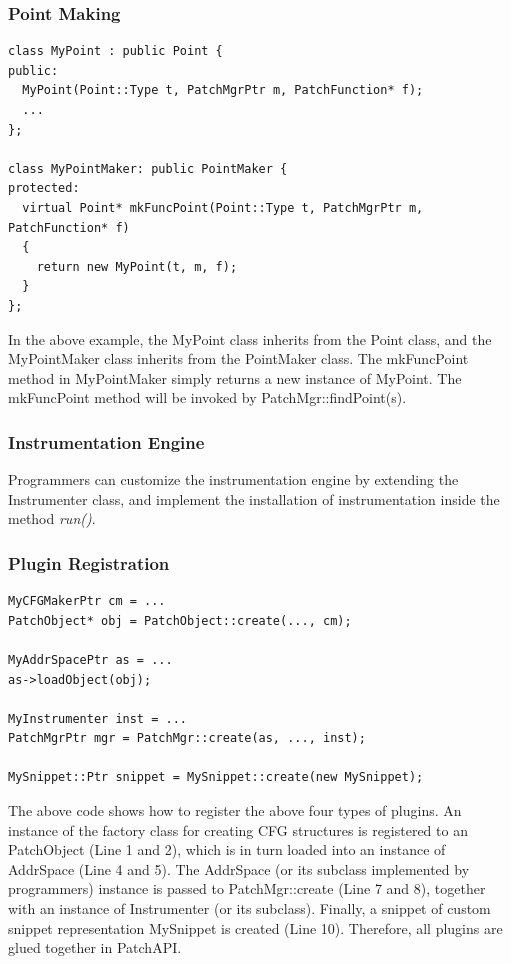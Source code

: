 \subsubsection{Point Making}
\begin{lstlisting}[caption=Example of point making]
class MyPoint : public Point {
public:
  MyPoint(Point::Type t, PatchMgrPtr m, PatchFunction* f);
  ...
};

class MyPointMaker: public PointMaker {
protected:
  virtual Point* mkFuncPoint(Point::Type t, PatchMgrPtr m, PatchFunction* f)
  {
    return new MyPoint(t, m, f);
  }
};
\end{lstlisting}
In the above example, the MyPoint class inherits from the Point class, and the
MyPointMaker class inherits from the PointMaker class. The mkFuncPoint method in
MyPointMaker simply returns a new instance of MyPoint. The mkFuncPoint method
will be invoked by PatchMgr::findPoint(s).


\subsubsection{Instrumentation Engine}

Programmers can customize the instrumentation engine by extending the
Instrumenter class, and implement the installation of instrumentation inside the
method \emph{run()}.

\subsubsection{Plugin Registration}
\begin{lstlisting}[caption=Example of registering plugins]
MyCFGMakerPtr cm = ...
PatchObject* obj = PatchObject::create(..., cm);

MyAddrSpacePtr as = ...
as->loadObject(obj);

MyInstrumenter inst = ...
PatchMgrPtr mgr = PatchMgr::create(as, ..., inst);

MySnippet::Ptr snippet = MySnippet::create(new MySnippet);
\end{lstlisting}
The above code shows how to register the above four types of plugins.  An
instance of the factory class for creating CFG structures is registered to an
PatchObject (Line 1 and 2), which is in turn loaded into an instance of
AddrSpace (Line 4 and 5). The AddrSpace (or its subclass implemented by
programmers) instance is passed to PatchMgr::create (Line 7 and 8), together
with an instance of Instrumenter (or its subclass). Finally, a snippet of custom
snippet representation MySnippet is created (Line 10). Therefore, all plugins
are glued together in PatchAPI.
